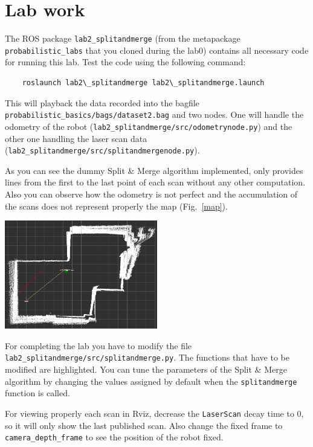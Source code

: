 \documentclass[a4paper,10pt]{article}
\begin{document}
\section{Lab work}

The ROS package \texttt{lab2\_splitandmerge} (from the metapackage \texttt{probabilistic\_labs} that you cloned during the lab0) contains all necessary code for running this lab. Test the code using the following command:

\begin{verbatim}
    roslaunch lab2\_splitandmerge lab2\_splitandmerge.launch
\end{verbatim}

This will playback the data recorded into the bagfile \texttt{probabilistic\_basics/bags/dataset2.bag} and two nodes. One will handle the odometry of the robot (\texttt{lab2\_splitandmerge/src/odometrynode.py}) and the other one handling the laser scan data (\texttt{lab2\_splitandmerge/src/splitandmergenode.py}).

As you can see the dummy Split \& Merge algorithm implemented, only provides lines from the first to the last point of each scan without any other computation. Also you can observe how
the odometry is not perfect and the accumulation of the scans does not represent properly the map (Fig.~\ref{map}).

\begin{center}
	\includegraphics[width=0.50\textwidth]{lab2-scans}
	\label{map}
\end{center}

For completing the lab you have to modify the file \texttt{lab2\_splitandmerge/src/splitandmerge.py}. The functions that have to be modified are highlighted. You can tune the parameters of the Split \& Merge algorithm by changing the values assigned by default when the \texttt{splitandmerge} function is called.

For viewing properly each scan in Rviz, decrease the \texttt{LaserScan} decay time to 0, so it will only show the last published scan. Also change the fixed frame to \texttt{camera\_depth\_frame} to see the position of the robot fixed.
\end{document}
